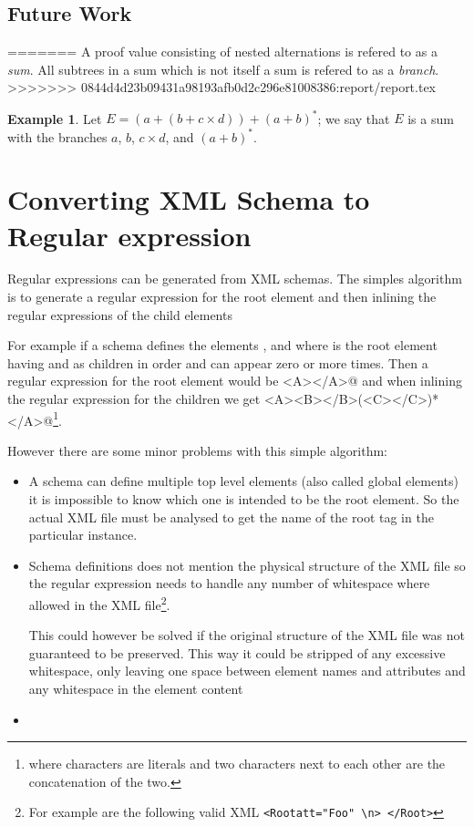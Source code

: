 \documentclass[a4paper, oneside]{memoir}
\theoremstyle{definition}
\newtheorem{example}{Example}
\begin{document}
\subsection{Future Work}
=======
A proof value consisting of nested alternations is refered to as a \emph{sum}. All subtrees in a sum which is not itself a sum is refered to as a \emph{branch}.
>>>>>>> 0844d4d23b09431a98193afb0d2c296e81008386:report/report.tex

\begin{example}
Let $E = (a + (b + c \times d)) + (a + b)^{*}$; we say that $E$ is a sum with the branches $a$, $b$, $c \times d$, and $(a + b)^{*}$.
\end{example}

\section{Converting XML Schema to Regular expression}

Regular expressions can be generated from XML schemas. The simples algorithm is
to generate a regular expression for the root element and then inlining the
regular expressions of the child elements

For example if a schema defines the elements \verb@A@, \verb@B@ and \verb@C@
where \verb@A@ is the root element having \verb@B@ and \verb@C@ as children in
order and \verb@C@ can appear zero or more times. Then a regular expression for
the root element would be \verb@<A></A>@ and when inlining the regular
expression for the children we get
\verb@<A><B></B>(<C></C>)*</A>@\footnote{where characters are literals and two
  characters next to each other are the concatenation of the two.}.
  
  However there are some minor problems with this simple algorithm:

  \begin{itemize}
  \item A schema can define multiple top level elements (also called global
    elements) it is impossible to know which one is intended to be the root
    element. So the actual XML file must be analysed to get the name of the root
    tag in the particular instance.

  \item Schema definitions does not mention the physical structure of the XML
    file so the regular expression needs to handle any number of whitespace
    where allowed in the XML file\footnote{For example are the following valid
      XML \texttt{<Root{\textvisiblespace}att="Foo"\textvisiblespace%
        \textvisiblespace\textbackslash{n}\textvisiblespace>\textvisiblespace%
        </Root\textvisiblespace\textvisiblespace>}}.

    This could however be solved if the original structure of the XML file was
    not guaranteed to be preserved. This way it could be stripped of any
    excessive whitespace, only leaving one space between element names and
    attributes and any whitespace in the element content

  \item 

  \end{itemize}
  
\end{document}
